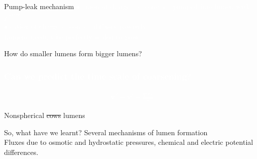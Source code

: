 \documentclass{beamer}
\begin{document}
\begin{frame}{Pump-leak mechanism}
\textcolor{white}{
$\bullet$ anion of charge $-e$, conc. $c_-$ pumped into lumen with $j^{active}$\\
$\bullet$ cation of charge $e$, con. $c_+$ diffuses passively\\
Lumens needn't be perfectly sealed to grow.
}
\end{frame}




\begin{frame}{\textcolor{yellow!10!blue!50!white!50}{How do smaller lumens form bigger lumens?}}


\begin{center}
\end{center} 
\end{frame}


























\begin{frame}
\frametitle{\textcolor{white}{Can we predict the time scale of coarsening?}}

\textcolor{white}{
\begin{align*}
\mathbf{v}^f = \mathbf{v}^c + \frac{\nabla P^f}{\kappa}
\end{align*}
}
\end{frame}


\begin{frame}{\textcolor{yellow!10!blue!50!white!50}{Nonspherical \st{cows} lumens}}

\end{frame}


\begin{frame}{\textcolor{yellow!10!blue!50!white!50}{So, what have we learnt?}}
\textcolor{green!40!yellow!20!blue!20}{Several mechanisms of lumen formation\\
Fluxes due to osmotic and hydrostatic pressures, chemical and electric potential differences.
}

\end{frame}
\end{document}
